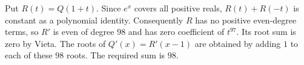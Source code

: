 Put $R(t)=Q(1+t)$. Since $e^x$ covers all positive reals, $R(t)+R(-t)$ is constant as a polynomial identity. Consequently $R$ has no positive even-degree terms, so $R\prime$ is even of degree $98$ and has zero coefficient of $t^{97}$. Its root sum is zero by Vieta. The roots of $Q\prime(x)=R\prime(x-1)$ are obtained by adding $1$ to each of these $98$ roots. The required sum is $\boxed{98}$.
